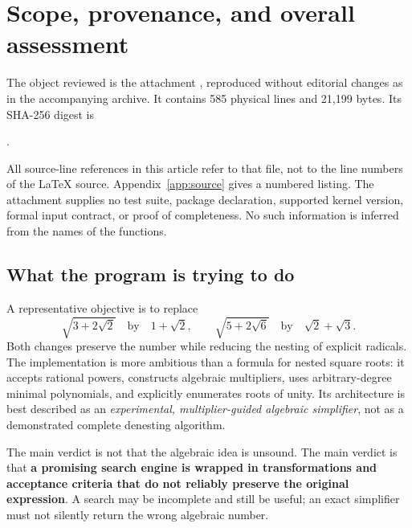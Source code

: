 \documentclass[11pt,letterpaper]{article}
\newcommand{\code}[1]{\texttt{\detokenize{#1}}}
\theoremstyle{definition}
\theoremstyle{remark}
\begin{document}
\section{Scope, provenance, and overall assessment}
\label{sec:scope}
The object reviewed is the attachment \code{Pasted text.txt}, reproduced
without editorial changes as \code{original.wl} in the accompanying archive.
It contains 585 physical lines and 21,199 bytes. Its SHA-256 digest is
\begin{center}\small
{}.
\end{center}
All source-line references in this article refer to that file, not to the
line numbers of the LaTeX source. Appendix~\ref{app:source} gives a numbered
listing. The attachment supplies no test suite, package declaration, supported
kernel version, formal input contract, or proof of completeness. No such
information is inferred from the names of the functions.

\subsection{What the program is trying to do}
A representative objective is to replace
\[
 \sqrt{3+2\sqrt2}\quad\text{by}\quad 1+\sqrt2,
 \qquad
 \sqrt{5+2\sqrt6}\quad\text{by}\quad \sqrt2+\sqrt3.
\]
Both changes preserve the number while reducing the nesting of explicit
radicals. The implementation is more ambitious than a formula for nested
square roots: it accepts rational powers, constructs algebraic multipliers,
uses arbitrary-degree minimal polynomials, and explicitly enumerates roots of
unity. Its architecture is best described as an \emph{experimental,
multiplier-guided algebraic simplifier}, not as a demonstrated complete
denesting algorithm.

The main verdict is not that the algebraic idea is unsound. The main verdict
is that \textbf{a promising search engine is wrapped in transformations and
acceptance criteria that do not reliably preserve the original expression}.
A search may be incomplete and still be useful; an exact simplifier must not
silently return the wrong algebraic number.
\end{document}
